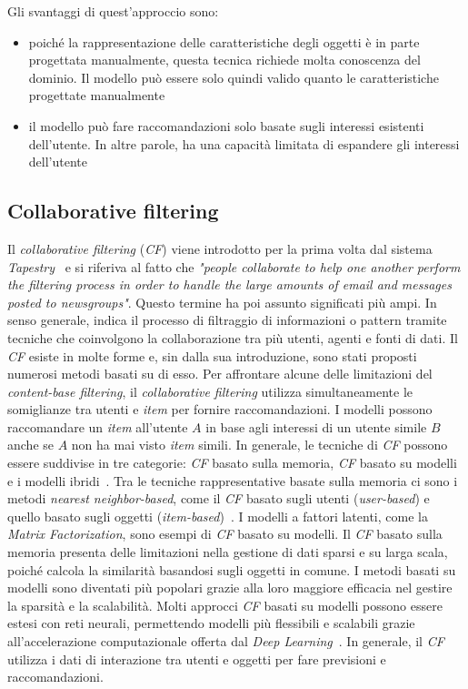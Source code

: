 Gli svantaggi di quest'approccio sono:
\begin{itemize}
    \item poiché la rappresentazione delle caratteristiche degli oggetti è in parte progettata manualmente, questa tecnica richiede molta conoscenza del dominio. Il modello può essere solo quindi valido quanto le caratteristiche progettate manualmente
    \item il modello può fare raccomandazioni solo basate sugli interessi esistenti dell'utente. In altre parole, ha una capacità limitata di espandere gli interessi dell'utente
\end{itemize}

\subsection{Collaborative filtering}
Il \textit{collaborative filtering} (\textit{CF}) viene introdotto per la prima volta dal sistema \textit{Tapestry}~\cite{Tapestry} e si riferiva al fatto che \textit{"people collaborate to help one another perform the filtering process in order to handle the large amounts of email and messages posted to newsgroups"}. Questo termine ha poi assunto significati più ampi. In senso generale, indica il processo di filtraggio di informazioni o pattern tramite tecniche che coinvolgono la collaborazione tra più utenti, agenti e fonti di dati. Il \textit{CF} esiste in molte forme e, sin dalla sua introduzione, sono stati proposti numerosi metodi basati su di esso. Per affrontare alcune delle limitazioni del \textit{content-base filtering}, il \textit{collaborative filtering} utilizza simultaneamente le somiglianze tra utenti e \textit{item} per fornire raccomandazioni. I modelli possono raccomandare un \textit{item} all'utente $A$ in base agli interessi di un utente simile $B$ anche se $A$ non ha mai visto \textit{item} simili. In generale, le tecniche di \textit{CF} possono essere suddivise in tre categorie: \textit{CF} basato sulla memoria, \textit{CF} basato su modelli e i modelli ibridi~\cite{Su}. Tra le tecniche rappresentative basate sulla memoria ci sono i metodi \textit{nearest neighbor-based}, come il \textit{CF} basato sugli utenti (\textit{user-based}) e quello basato sugli oggetti (\textit{item-based})~\cite{Sarwar}. I modelli a fattori latenti, come la \textit{Matrix Factorization}, sono esempi di \textit{CF} basato su modelli. Il \textit{CF} basato sulla memoria presenta delle limitazioni nella gestione di dati sparsi e su larga scala, poiché calcola la similarità basandosi sugli oggetti in comune. I metodi basati su modelli sono diventati più popolari grazie alla loro maggiore efficacia nel gestire la sparsità e la scalabilità. Molti approcci \textit{CF} basati su modelli possono essere estesi con reti neurali, permettendo modelli più flessibili e scalabili grazie all'accelerazione computazionale offerta dal \textit{Deep Learning}~\cite{Zhang}. In generale, il \textit{CF} utilizza i dati di interazione tra utenti e oggetti per fare previsioni e raccomandazioni.


